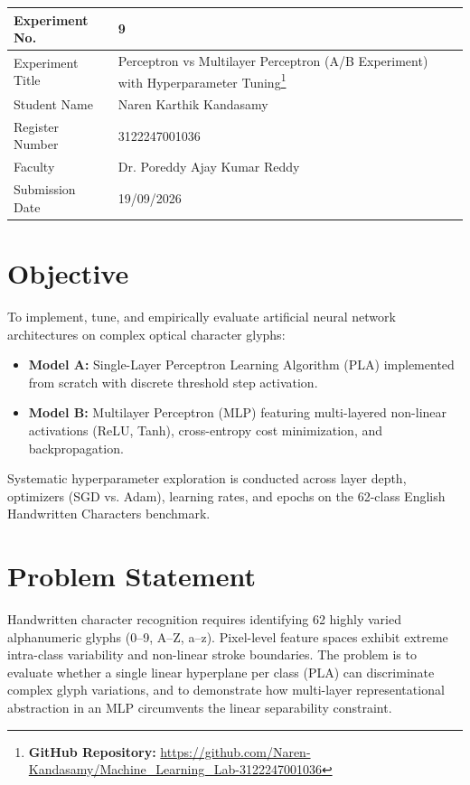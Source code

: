 \documentclass[12pt,a4paper]{article}
\begin{document}
\begin{tabular}{|p{4cm}|p{11cm}|}
\hline
Experiment No. & 9 \\ \hline
Experiment Title & Perceptron vs Multilayer Perceptron (A/B Experiment) with Hyperparameter Tuning\footnote{\textbf{GitHub Repository: }\url{https://github.com/Naren-Kandasamy/Machine_Learning_Lab-3122247001036}}\\ \hline
Student Name & Naren Karthik Kandasamy \\ \hline
Register Number & 3122247001036 \\ \hline
Faculty & Dr. Poreddy Ajay Kumar Reddy \\ \hline
Submission Date & 19/09/2026 \\ \hline
\end{tabular}

\vspace{1em}

\section{Objective}
To implement, tune, and empirically evaluate artificial neural network architectures on complex optical character glyphs:
\begin{itemize}[noitemsep]
    \item \textbf{Model A:} Single-Layer Perceptron Learning Algorithm (PLA) implemented from scratch with discrete threshold step activation.
    \item \textbf{Model B:} Multilayer Perceptron (MLP) featuring multi-layered non-linear activations (ReLU, Tanh), cross-entropy cost minimization, and backpropagation.
\end{itemize}
Systematic hyperparameter exploration is conducted across layer depth, optimizers (SGD vs. Adam), learning rates, and epochs on the 62-class English Handwritten Characters benchmark.

\section{Problem Statement}
Handwritten character recognition requires identifying 62 highly varied alphanumeric glyphs (0--9, A--Z, a--z). Pixel-level feature spaces exhibit extreme intra-class variability and non-linear stroke boundaries. The problem is to evaluate whether a single linear hyperplane per class (PLA) can discriminate complex glyph variations, and to demonstrate how multi-layer representational abstraction in an MLP circumvents the linear separability constraint.
\end{document}
